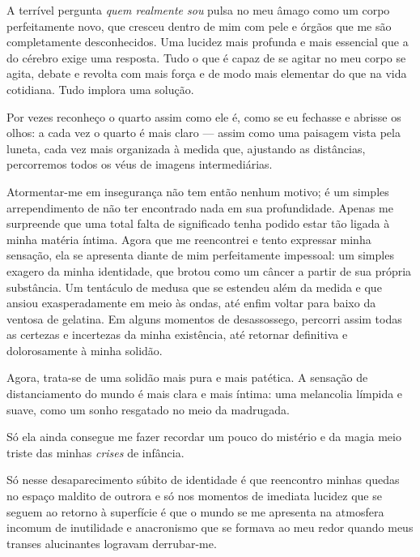 A terrível pergunta \textit{quem realmente sou} pulsa no meu âmago como um
corpo perfeitamente novo, que cresceu dentro de mim com pele e órgãos que me
são completamente desconhecidos. Uma lucidez mais profunda e mais essencial
que a do cérebro exige uma resposta. Tudo o que é capaz de se agitar no meu
corpo se agita, debate e revolta com mais força e de modo mais elementar do
que na vida cotidiana. Tudo implora uma solução.

Por vezes reconheço o quarto assim como ele é, como se eu fechasse e abrisse
os olhos: a cada vez o quarto é mais claro --- assim como uma paisagem vista
pela luneta, cada vez mais organizada à medida que, ajustando as distâncias,
percorremos todos os véus de imagens intermediárias.


Atormentar-me em insegurança não tem então nenhum motivo; é um simples
arrependimento de não ter encontrado nada em sua profundidade. Apenas me
surpreende que uma total falta de significado tenha podido estar tão ligada à
minha matéria íntima. Agora que me reencontrei e tento expressar minha
sensação, ela se apresenta diante de mim perfeitamente impessoal: um simples
exagero da minha identidade, que brotou como um câncer a partir de sua
própria substância. Um tentáculo de medusa que se estendeu além da medida e
que ansiou exasperadamente em meio às ondas, até enfim voltar para baixo da
ventosa de gelatina. Em alguns momentos de desassossego, percorri assim todas
as certezas e incertezas da minha existência, até retornar definitiva e
dolorosamente à minha solidão.

Agora, trata-se de uma solidão mais pura e mais patética. A sensação de
distanciamento do mundo é mais clara e mais íntima: uma melancolia límpida e
suave, como um sonho resgatado no meio da madrugada.

Só ela ainda consegue me fazer recordar um pouco do mistério e da magia meio
triste das minhas \textit{crises} de infância.

Só nesse desaparecimento súbito de identidade é que reencontro minhas quedas
no espaço maldito de outrora e só nos momentos de imediata lucidez que se
seguem ao retorno à superfície é que o mundo se me apresenta na atmosfera
incomum de inutilidade e anacronismo que se formava ao meu redor quando meus
transes alucinantes logravam derrubar-me.


